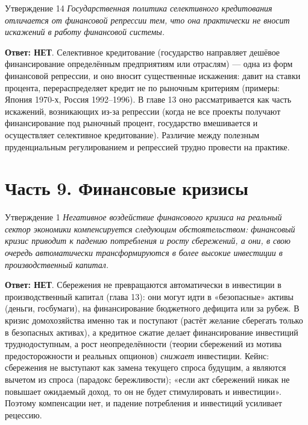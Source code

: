 \documentclass[10pt,a4paper]{article}
\newcommand{\qnet}{\textbf{\color{nored}Ответ: НЕТ}}
\newenvironment{answer}[2]{%
  \begin{qbox}{Утверждение #1}
  \textit{#2}\par\smallskip
}{%
  \end{qbox}\vspace{2pt}
}
\begin{document}
\begin{answer}{14}{Государственная политика селективного кредитования отличается от финансовой репрессии тем, что она практически не вносит искажений в работу финансовой системы.}
\qnet. Селективное кредитование (государство направляет дешёвое финансирование определённым предприятиям или отраслям) --- одна из форм финансовой репрессии, и оно вносит существенные искажения: давит на ставки процента, перераспределяет кредит не по рыночным критериям (примеры: Япония 1970-х, Россия 1992--1996). В главе 13 оно рассматривается как часть искажений, возникающих из-за репрессии (когда не все проекты получают финансирование под рыночный процент, государство вмешивается и осуществляет селективное кредитование). Различие между полезным пруденциальным регулированием и репрессией трудно провести на практике.
\end{answer}

\newpage
\section{Часть 9. Финансовые кризисы}

\begin{answer}{1}{Негативное воздействие финансового кризиса на реальный сектор экономики компенсируется следующим обстоятельством: финансовый кризис приводит к падению потребления и росту сбережений, а они, в свою очередь автоматически трансформируются в более высокие инвестиции в производственный капитал.}
\qnet. Сбережения не превращаются автоматически в инвестиции в производственный капитал (глава 13): они могут идти в «безопасные» активы (деньги, госбумаги), на финансирование бюджетного дефицита или за рубеж. В кризис домохозяйства именно так и поступают (растёт желание сберегать только в безопасных активах), а кредитное сжатие делает финансирование инвестиций труднодоступным, а рост неопределённости (теории сбережений из мотива предосторожности и реальных опционов) \emph{снижает} инвестиции. Кейнс: сбережения не выступают как замена текущего спроса будущим, а являются вычетом из спроса (парадокс бережливости); «если акт сбережений никак не повышает ожидаемый доход, то он не будет стимулировать и инвестиции». Поэтому компенсации нет, и падение потребления и инвестиций усиливает рецессию.
\end{answer}
\end{document}
